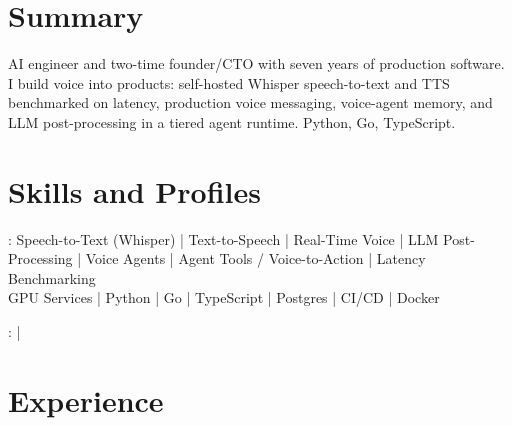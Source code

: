 \documentclass[print]{jack-resume}
\begin{document}
\pagecolor{darkmodeBackground}


\begin{minipage}[t][1cm][t]{.03\textwidth}
    \hfill
\end{minipage}

\section{Summary}
AI engineer and two-time founder/CTO with seven years of production software. I build voice into products: self-hosted Whisper speech-to-text and TTS benchmarked on latency, production voice messaging, voice-agent memory, and LLM post-processing in a tiered agent runtime. Python, Go, TypeScript.
\sectionsep

\section{Skills and Profiles}
:
Speech-to-Text (Whisper) \hfill | \hfill
Text-to-Speech \hfill | \hfill
Real-Time Voice \hfill | \hfill
LLM Post-Processing \hfill | \hfill
Voice Agents \hfill | \hfill
Agent Tools / Voice-to-Action \hfill | \hfill
Latency Benchmarking \\
\hspace{1.0cm} GPU Services \hfill | \hfill
Python \hfill | \hfill
Go \hfill | \hfill
TypeScript \hfill | \hfill
Postgres \hfill | \hfill
CI/CD \hfill | \hfill
Docker \\

\raggedright{
    :
      \href{https://www.linkedin.com/in/jack-sturtevant/}{ \ExternalLink} |
     \href{https://github.com/jacksturt}{ \ExternalLink}}

\section{Experience}
\end{document}
